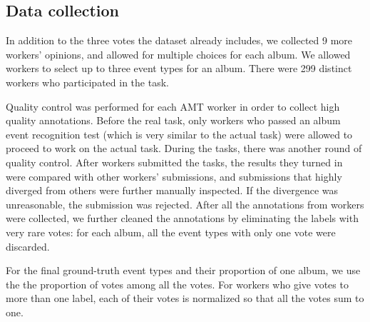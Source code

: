 \documentclass[runningheads]{llncs}
\begin{document}
\subsection{Data collection}
In addition to the three votes the dataset already includes, we collected 9 more workers' opinions, and allowed for multiple choices for each album. We allowed workers to select up to three event types for an album. There were  299 distinct workers who participated in the task.

Quality control was performed for each AMT worker in order to collect high quality annotations. Before the real task, only workers who passed an album event recognition test (which is very similar to the actual task) were allowed to proceed to work on the actual task. During the tasks, there was another round of quality control. After workers submitted the tasks, the results they turned in were compared with other workers' submissions, and submissions that highly diverged from others were further manually inspected. If the divergence was unreasonable, the submission was rejected. After all the annotations from workers were collected, we further cleaned the annotations by eliminating the labels with very rare votes: for each album, all the event types with only one vote were discarded. 
%
%
%
%
%
%

For the final ground-truth event types and their proportion of one album, we use the the proportion of votes among all the votes. For workers who give votes to more than one label, each of their votes is normalized so that all the votes sum to one.
%
%
%
\end{document}
